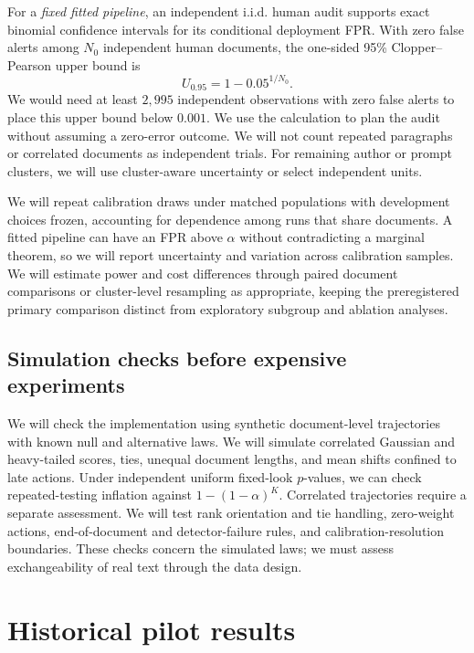 \documentclass[pdflatex,sn-mathphys-num]{sn-jnl}
\begin{document}
For a \emph{fixed fitted pipeline}, an independent i.i.d. human audit supports exact binomial confidence intervals for its conditional deployment FPR. With zero false alerts among \(N_0\) independent human documents, the one-sided 95\% Clopper--Pearson upper bound \citep{clopper1934} is
\begin{equation}
 U_{0.95}=1-0.05^{1/N_0}.
 \label{eq:zeroevents}
\end{equation}
We would need at least \(2{,}995\) independent observations with zero false alerts to place this upper bound below \(0.001\). We use the calculation to plan the audit without assuming a zero-error outcome. We will not count repeated paragraphs or correlated documents as independent trials. For remaining author or prompt clusters, we will use cluster-aware uncertainty or select independent units.

We will repeat calibration draws under matched populations with development choices frozen, accounting for dependence among runs that share documents. A fitted pipeline can have an FPR above \(\alpha\) without contradicting a marginal theorem, so we will report uncertainty and variation across calibration samples. We will estimate power and cost differences through paired document comparisons or cluster-level resampling as appropriate, keeping the preregistered primary comparison distinct from exploratory subgroup and ablation analyses.

\subsection{Simulation checks before expensive experiments}

We will check the implementation using synthetic document-level trajectories with known null and alternative laws. We will simulate correlated Gaussian and heavy-tailed scores, ties, unequal document lengths, and mean shifts confined to late actions. Under independent uniform fixed-look \(p\)-values, we can check repeated-testing inflation against \(1-(1-\alpha)^K\). Correlated trajectories require a separate assessment. We will test rank orientation and tie handling, zero-weight actions, end-of-document and detector-failure rules, and calibration-resolution boundaries. These checks concern the simulated laws; we must assess exchangeability of real text through the data design.

\section{Historical pilot results}\label{sec:results}
\end{document}
